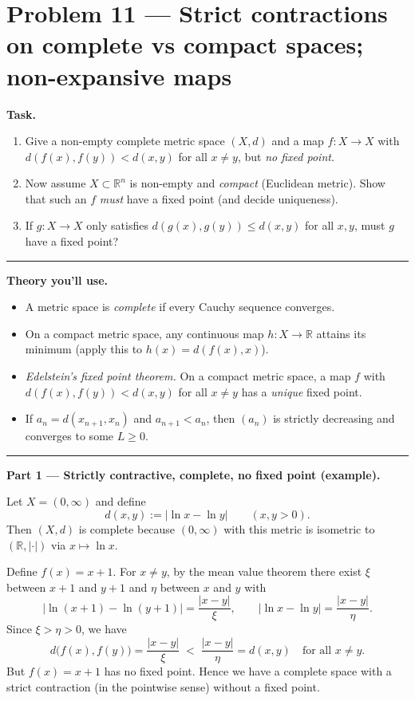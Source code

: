 \documentclass[12pt,a4paper]{article}
\theoremstyle{plain}
\theoremstyle{definition}
\theoremstyle{remark}
\theoremstyle{remark}
\begin{document}
\section*{Problem 11 — Strict contractions on complete vs compact spaces; non-expansive maps}

\noindent\textbf{Task.}
\begin{enumerate}\setlength{\itemsep}{4pt}
	\item Give a non-empty complete metric space $(X,d)$ and a map $f:X\to X$ with
	$d(f(x),f(y))<d(x,y)$ for all $x\neq y$, but \emph{no fixed point}.
	\item Now assume $X\subset\mathbb{R}^n$ is non-empty and \emph{compact} (Euclidean metric).
	Show that such an $f$ \emph{must} have a fixed point (and decide uniqueness).
	\item If $g:X\to X$ only satisfies $d(g(x),g(y))\le d(x,y)$ for all $x,y$, must $g$ have a fixed point?
\end{enumerate}

\bigskip
\hrule
\bigskip

\noindent\textbf{Theory you’ll use.}
\begin{itemize}\setlength{\itemsep}{6pt}
	\item A metric space is \emph{complete} if every Cauchy sequence converges.
	\item On a compact metric space, any continuous map $h:X\to\mathbb{R}$ attains its minimum
	(apply this to $h(x)=d(f(x),x)$).
	\item \emph{Edelstein’s fixed point theorem.} On a compact metric space, a map
	$f$ with $d(f(x),f(y))<d(x,y)$ for all $x\neq y$ has a \emph{unique} fixed point.
	\item If $a_n=d(x_{n+1},x_n)$ and $a_{n+1}<a_n$, then $(a_n)$ is strictly decreasing
	and converges to some $L\ge0$.
\end{itemize}

\bigskip
\hrule
\bigskip

\noindent\textbf{Part 1 — Strictly contractive, complete, no fixed point (example).}

\medskip
\noindent Let $X=(0,\infty)$ and define
\[
d(x,y):=\big|\ln x-\ln y\big|\qquad (x,y>0).
\]
Then $(X,d)$ is complete because $(0,\infty)$ with this metric is isometric to
$(\mathbb{R},|\cdot|)$ via $x\mapsto \ln x$.

\medskip
\noindent Define $f(x)=x+1$. For $x\neq y$, by the mean value theorem there exist
$\xi$ between $x+1$ and $y+1$ and $\eta$ between $x$ and $y$ with
\[
\big|\ln(x+1)-\ln(y+1)\big|=\frac{|x-y|}{\xi},
\qquad
\big|\ln x-\ln y\big|=\frac{|x-y|}{\eta}.
\]
Since $\xi>\eta>0$, we have
\[
d\big(f(x),f(y)\big)=\frac{|x-y|}{\xi}\;<\;\frac{|x-y|}{\eta}=d(x,y)
\quad\text{for all }x\ne y.
\]
But $f(x)=x+1$ has no fixed point. Hence we have a complete space with a strict
contraction (in the pointwise sense) without a fixed point.
\end{document}

